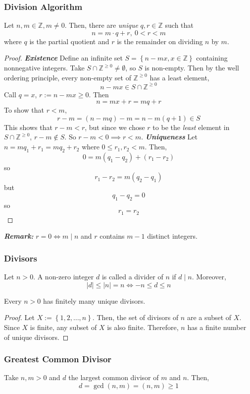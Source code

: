 \documentclass{report}
\newcommand{\Z}{\mathbb{Z}}
\newcommand{\textib}[1]{\textit{\textbf{{#1}}}}
\newcommand{\proposition}[1]{\begin{tcolorbox}[title=\textit{Proposition}]{#1}\end{tcolorbox}}
\newcommand{\theorem}[1]{\begin{tcolorbox}[title=\textit{Theorem}]{#1}\end{tcolorbox}}
\begin{document}
\subsubsection{Division Algorithm}
\theorem{
    Let $n, m \in \Z, m \neq 0$. Then, there are \textit{unique} $q, r \in \Z$ such that 
    \[n = m \cdot q + r, \ 0 < r < m\]
    where $q$ is the partial quotient and $r$ is the remainder on dividing $n$ by $m$.
}
\begin{proof}
    \textib{Existence}
    \newline
    Define an infinite set $S = \left\{ n - mx, x \in \Z \right\}$ containing nonnegative integers.
    Take $S \cap \Z^{\geq 0} \neq \emptyset$, so $S$ is non-empty. Then by the well ordering 
    principle, every non-empty set of $\Z^{\geq 0}$ has a least element, 
    \[n - mx \in S \cap \Z^{\geq 0}\]
    Call $q = x$, $r := n - mx \geq 0$. Then 
    \[n = mx + r = mq + r\]
    To show that $r < m$,
    \[r - m = (n - mq) - m = n - m(q + 1) \in S\] 
    This shows that $r - m < r$, but since we chose
    $r$ to be the \textit{least} element in $S \cap \Z^{\geq 0}$, $r - m \not\in S$. So $r - m < 0
    \implies r < m$.
    \newline
    \newline
    \textib{Uniqueness}
    \newline
    Let $n = mq_1 + r_1 = mq_2 + r_2$ where $0 \leq r_1, r_2 < m$. Then,
    \[0 = m(q_1 - q_2) + (r_1 - r_2)\]
    so
    \[r_1 - r_2 = m(q_2 - q_1)\]
    but
    \[q_1 - q_2 = 0\]
    so 
    \[r_1 = r_2\]
\end{proof}
\textib{Remark:} $r = 0 \iff m \mid n$ and $r$ contains $m - 1$ distinct integers.


\subsubsection{Divisors}
Let $n > 0$. A non-zero integer $d$ is called a divider of $n$ if $d \mid n$. Moreover,
\[|d| \leq |n| = n \iff -n \leq d \leq n\]

\proposition{
    Every $n > 0$ has finitely many unique divisors.
}
\begin{proof}
    Let $X := \left\{ 1, 2, \ldots, n \right\}$. Then, the set of divisors of $n$ are a subset
    of $X$. Since $X$ is finite, any subset of $X$ is also finite. Therefore, $n$ has a finite
    number of unique divisors.
\end{proof}


\subsubsection{Greatest Common Divisor}
Take $n, m > 0$ and $d$ the largest common divisor of $m$ and $n$. Then, 
\[d = \gcd(n, m) = (n, m) \geq 1\]
\end{document}
